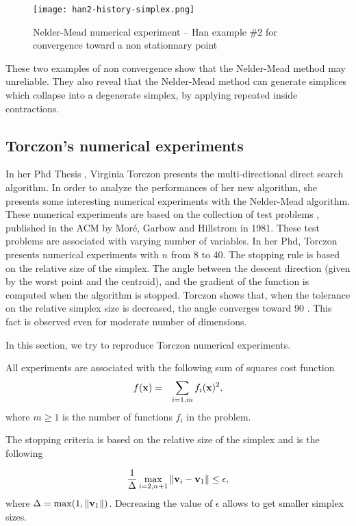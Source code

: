\begin{figure}
\begin{center}
\texttt{[image: han2-history-simplex.png]}
\end{center}
\caption{Nelder-Mead numerical experiment -- Han example \#2 for convergence toward
a non stationnary point}
\label{fig-nm-numexp-han2}
\end{figure}

These two examples of non convergence show that the Nelder-Mead method may unreliable.
They also reveal that the Nelder-Mead method can generate simplices which collapse 
into a degenerate simplex, by applying repeated inside contractions.

\subsection{Torczon's numerical experiments}

In her Phd Thesis \cite{Torczon89multi-directionalsearch}, Virginia Torczon 
presents the multi-directional direct search algorithm. In order to analyze the 
performances of her new algorithm, she presents some interesting numerical 
experiments with the Nelder-Mead algorithm. 
These numerical experiments are based on the collection of test problems \cite{355943},
published in the ACM by Mor\'e, Garbow and Hillstrom in 1981. 
These test problems are associated with varying number of variables.
In her Phd, Torczon presents numerical experiments with $n$ from 8 
to 40.
The stopping rule is based on the relative size of the simplex. 
The angle between the descent direction (given by the worst point and the centroid), and the
gradient of the function is computed when the algorithm is stopped.
Torczon shows that, when the tolerance on the relative simplex size is decreased, the 
angle converges toward 90 \degre. This fact is observed even for moderate 
number of dimensions.

In this section, we try to reproduce Torczon numerical experiments.

All experiments are associated with the following sum of squares cost function 
\begin{eqnarray}
\label{torzcon-sumofsquares}
f(\mathbf{x}) &=& \sum_{i=1,m} f_i(\mathbf{x})^2,
\end{eqnarray}
where $m\geq 1$ is the number of functions $f_i$ in the problem.

The stopping criteria is based on the relative size of the 
simplex and is the following 

\begin{eqnarray}
\label{torzcon-stopping}
\frac{1}{\Delta} \max_{i=2,n+1} \|\mathbf{v}_i - \mathbf{v}_1\| \leq \epsilon,
\end{eqnarray}
where $\Delta = \max( 1 , \|\mathbf{v}_1\| )$. Decreasing the value of 
$\epsilon$ allows to get smaller simplex sizes.

